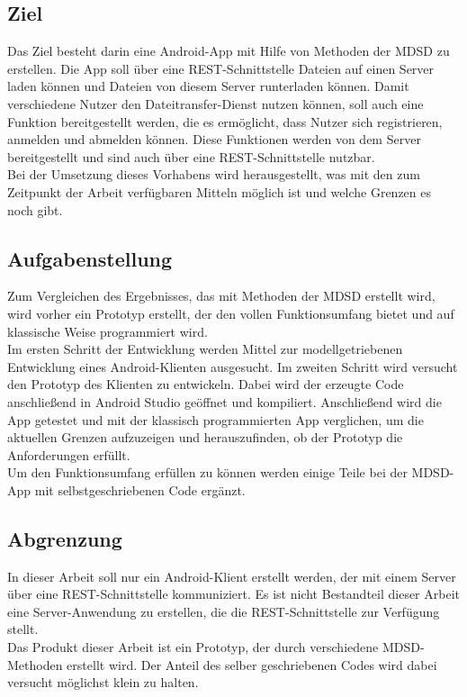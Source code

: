 \documentclass[a4paper,twoside]{article}
\begin{document}
	\subsection{Ziel}
	Das Ziel besteht darin eine Android-App mit Hilfe von Methoden der MDSD zu erstellen. Die App soll \"uber eine REST-Schnittstelle Dateien auf einen Server laden k\"onnen und Dateien von diesem Server runterladen k\"onnen. Damit verschiedene Nutzer den Dateitransfer-Dienst nutzen k\"onnen, soll auch eine Funktion bereitgestellt werden, die es erm\"oglicht, dass Nutzer sich registrieren, anmelden und abmelden k\"onnen. Diese Funktionen werden von dem Server bereitgestellt und sind auch \"uber eine REST-Schnittstelle nutzbar.\\
	Bei der Umsetzung dieses Vorhabens wird herausgestellt, was mit den zum Zeitpunkt der Arbeit verf\"ugbaren Mitteln m\"oglich ist und welche Grenzen es noch gibt.
	
	\subsection{Aufgabenstellung}
	Zum Vergleichen des Ergebnisses, das mit Methoden der MDSD erstellt wird, wird vorher ein Prototyp erstellt, der den vollen Funktionsumfang bietet und auf klassische Weise programmiert wird.\\
	Im ersten Schritt der Entwicklung werden Mittel zur modellgetriebenen Entwicklung eines Android-Klienten ausgesucht. Im zweiten Schritt wird versucht den Prototyp des Klienten zu entwickeln. Dabei wird der erzeugte Code anschlie\ss{}end in Android Studio ge\"offnet und kompiliert. Anschlie\ss{}end wird die App getestet und mit der klassisch programmierten App verglichen, um die aktuellen Grenzen aufzuzeigen und herauszufinden, ob der Prototyp die Anforderungen erf\"ullt.\\
	Um den Funktionsumfang erf\"ullen zu k\"onnen werden einige Teile bei der MDSD-App mit selbstgeschriebenen Code erg\"anzt.
	
	\subsection{Abgrenzung}
	In dieser Arbeit soll nur ein Android-Klient erstellt werden, der mit einem Server \"uber eine REST-Schnittstelle kommuniziert. Es ist nicht Bestandteil dieser Arbeit eine Server-Anwendung zu erstellen, die die REST-Schnittstelle zur Verf\"ugung stellt.\\
	Das Produkt dieser Arbeit ist ein Prototyp, der durch verschiedene MDSD-Methoden erstellt wird. Der Anteil des selber geschriebenen Codes wird dabei versucht m\"oglichst klein zu halten.
	
\end{document}
